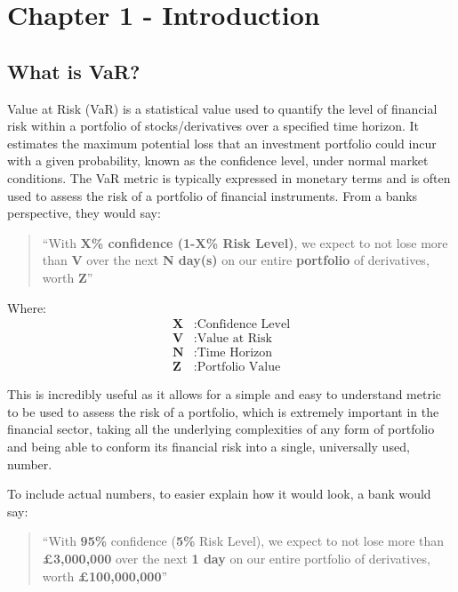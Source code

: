\documentclass{article}
\begin{document}
\section{Chapter 1 - Introduction}

\subsection{What is VaR?}

Value at Risk (VaR) is a statistical value used to quantify the level of financial risk within a portfolio of stocks/derivatives over a specified time horizon. It estimates the maximum potential loss that an investment portfolio could incur with a given probability, known as the confidence level, under normal market conditions. The VaR metric is typically expressed in monetary terms and is often used to assess the risk of a portfolio of financial instruments. From a banks perspective, they would say:
\begin{quote}
  ``With \textbf{X\% confidence (1-X\% Risk Level)}, we expect to not lose more than \textbf{V} over the next \textbf{N day(s)} on our entire \textbf{portfolio} of derivatives, worth \textbf{Z}'' %

\end{quote}

Where:
\begin{align*}
  \textbf{X} & : \text{Confidence Level} \\
  \textbf{V} & : \text{Value at Risk} \\
  \textbf{N} & : \text{Time Horizon} \\
  \textbf{Z} & : \text{Portfolio Value}
\end{align*}

This is incredibly useful as it allows for a simple and easy to understand metric to be used to assess the risk of a portfolio, which is extremely important in the financial sector, taking all the underlying complexities of any form of portfolio and being able to conform its financial risk into a single, universally used, number. \\\vspace{0.3cm}

To include actual numbers, to easier explain how it would look, a bank would say:
\begin{quote}
  ``With \textbf{95\%} confidence (\textbf{5\%} Risk Level), we expect to not lose more than \textbf{£3,000,000} over the next \textbf{1 day} on our entire portfolio of derivatives, worth \textbf{£100,000,000}''
\end{quote}
\end{document}

